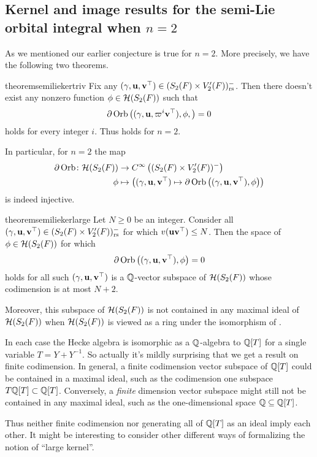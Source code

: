 \subsection{Kernel and image results for the semi-Lie orbital integral when $n=2$}
As we mentioned our earlier conjecture 
is true for $n = 2$.
More precisely, we have the following two theorems.

\begin{restatable}{theorem}{semiliekertriv}
  \label{thm:semi_lie_ker_trivial}
  Fix any ${(\gamma, \mathbf u, \mathbf v^\top)} \in (S_2(F) \times V'_2(F))_{\mathrm{rs}}^-$.
  Then there doesn't exist any nonzero function $\phi \in \mathcal H(S_2(F))$ such that
  \[ \partial \operatorname{Orb} \left( (\gamma, \mathbf u, \varpi^i \mathbf v^\top), \phi, \right) = 0 \]
  holds for every integer $i$.
  Thus  holds for $n = 2$.
\end{restatable}

In particular, for $n=2$ the map
\begin{align*}
  \partial\operatorname{Orb} \colon \mathcal H(S_2(F)) &\to C^\infty\left( (S_2(F) \times V'_2(F))^- \right) \\
  \phi &\mapsto \left( {(\gamma, \mathbf u, \mathbf v^\top)} \mapsto \partial \operatorname{Orb} \left({(\gamma, \mathbf u, \mathbf v^\top)}, \phi \right) \right)
\end{align*}
is indeed injective.

\begin{restatable}{theorem}{semiliekerlarge}
  \label{thm:semi_lie_ker_huge}
  Let $N \ge 0$ be an integer.
  Consider all ${(\gamma, \mathbf u, \mathbf v^\top)} \in (S_2(F) \times V'_2(F))_{\mathrm{rs}}^-$ for which $v(\mathbf u\mathbf v^\top) \le N$.
  Then the space of $\phi \in \mathcal H(S_2(F))$ for which
  \[ \partial \operatorname{Orb} \left( {(\gamma, \mathbf u, \mathbf v^\top)}, \phi \right) = 0 \]
  holds for all such ${(\gamma, \mathbf u, \mathbf v^\top)}$ is a $\mathbb Q$-vector subspace of $\mathcal H(S_2(F))$
  whose codimension is at most $N + 2$.

  Moreover, this subspace of $\mathcal H(S_2(F))$
  is not contained in any maximal ideal of $\mathcal H(S_2(F))$
  when $\mathcal H(S_2(F))$ is viewed as a ring under the isomorphism of .
\end{restatable}

\begin{remark}
  In each case the Hecke algebra is isomorphic as a $\mathbb Q$-algebra to $\mathbb Q[T]$
  for a single variable $T = Y+Y^{-1}$.
  So actually it's mildly surprising that we get a result on finite codimension.
  In general, a finite codimension vector subspace of $\mathbb Q[T]$ could
  be contained in a maximal ideal,
  such as the codimension one subspace $T \mathbb Q[T] \subset \mathbb Q[T]$.
  Conversely, a \emph{finite} dimension vector subspace might still
  not be contained in any maximal ideal,
  such as the one-dimensional space $\mathbb Q \subseteq \mathbb Q[T]$.

  Thus neither finite codimension nor generating all of $\mathbb Q[T]$ as an ideal imply each other.
  It might be interesting to consider other different ways
  of formalizing the notion of ``large kernel''.
\end{remark}

